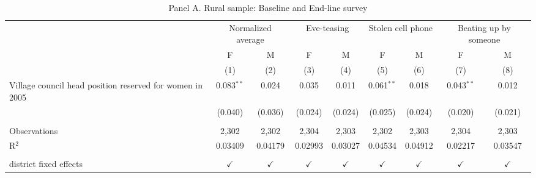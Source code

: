 
\begin{table}[htbp]
   \caption{Panel A. Rural sample: Baseline and End-line survey}
   \bigskip
   \centering
   \begin{tabular}{lcccccccc}
      \toprule
       & \multicolumn{2}{c}{Normalized average} & \multicolumn{2}{c}{Eve-teasing} & \multicolumn{2}{c}{Stolen cell phone} & \multicolumn{2}{c}{Beating up by someone}\\
                                                                & F             & M             & F             & M             & F             & M             & F             & M \\   
                                                                & (1)           & (2)           & (3)           & (4)           & (5)           & (6)           & (7)           & (8)\\  
      \midrule 
       Village council head position reserved for women in 2005 & 0.083$^{**}$  & 0.024         & 0.035         & 0.011         & 0.061$^{**}$  & 0.018         & 0.043$^{**}$  & 0.012\\   
                                                                & (0.040)       & (0.036)       & (0.024)       & (0.024)       & (0.025)       & (0.024)       & (0.020)       & (0.021)\\   
       \\
      Observations                                              & 2,302         & 2,302         & 2,304         & 2,303         & 2,302         & 2,303         & 2,304         & 2,303\\  
      R$^2$                                                     & 0.03409       & 0.04179       & 0.02993       & 0.03027       & 0.04534       & 0.04912       & 0.02217       & 0.03547\\  
       \\
      district fixed effects                                    & $\checkmark$  & $\checkmark$  & $\checkmark$  & $\checkmark$  & $\checkmark$  & $\checkmark$  & $\checkmark$  & $\checkmark$\\   
      \bottomrule
   \end{tabular}
\end{table}



